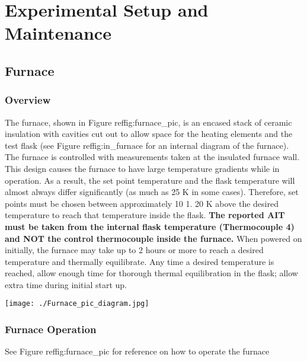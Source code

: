 \hypertarget{experimental-setup-and-maintenance}{%
\section{Experimental Setup and
Maintenance}\label{experimental-setup-and-maintenance}}

\hypertarget{furnace}{%
\subsection{Furnace}\label{furnace}}

\hypertarget{overview}{%
\subsubsection{Overview}\label{overview}}

The furnace, shown in Figure reffig:furnace\_pic, is an encased stack of
ceramic insulation with cavities cut out to allow space for the heating
elements and the test flask (see Figure reffig:in\_furnace for an
internal diagram of the furnace). The furnace is controlled with
measurements taken at the insulated furnace wall. This design causes the
furnace to have large temperature gradients while in operation. As a
result, the set point temperature and the flask temperature will almost
always differ significantly (as much as 25 K in some cases). Therefore,
set points must be chosen between approximately 10 1. 20 K above the
desired temperature to reach that temperature inside the flask.
\textbf{The reported AIT must be taken from the internal flask
temperature (Thermocouple 4) and NOT the control thermocouple inside the
furnace.} When powered on initially, the furnace may take up to 2 hours
or more to reach a desired temperature and thermally equilibrate. Any
time a desired temperature is reached, allow enough time for thorough
thermal equilibration in the flask; allow extra time during initial
start up.

\texttt{[image: ./Furnace\_pic\_diagram.jpg]}

\hypertarget{furnace-operation}{%
\subsubsection{Furnace Operation}\label{furnace-operation}}

See Figure reffig:furnace\_pic for reference on how to operate the
furnace

